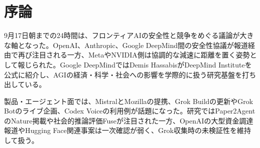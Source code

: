 \section*{序論}
9月17日朝までの24時間は、フロンティアAIの安全性と競争をめぐる議論が大きな軸となった。OpenAI、Anthropic、Google DeepMind間の安全性協議が報道経由で再び注目される一方、MetaやNVIDIA側は協調的な減速に距離を置く姿勢として報じられた。Google DeepMindではDemis HassabisがDeepMind Instituteを公式に紹介し、AGIの経済・科学・社会への影響を学際的に扱う研究基盤を打ち出している。

製品・エージェント面では、MistralとMozillaの提携、Grok Buildの更新やGrok Botのライブ企画、Codex Voiceの利用例が話題になった。研究ではPaper2AgentのNature掲載や社会的推論評価Fuseが注目された一方、OpenAIの大型資金調達報道やHugging Face関連事案は一次確認が弱く、Grok収集時の未検証性を維持して扱う。
